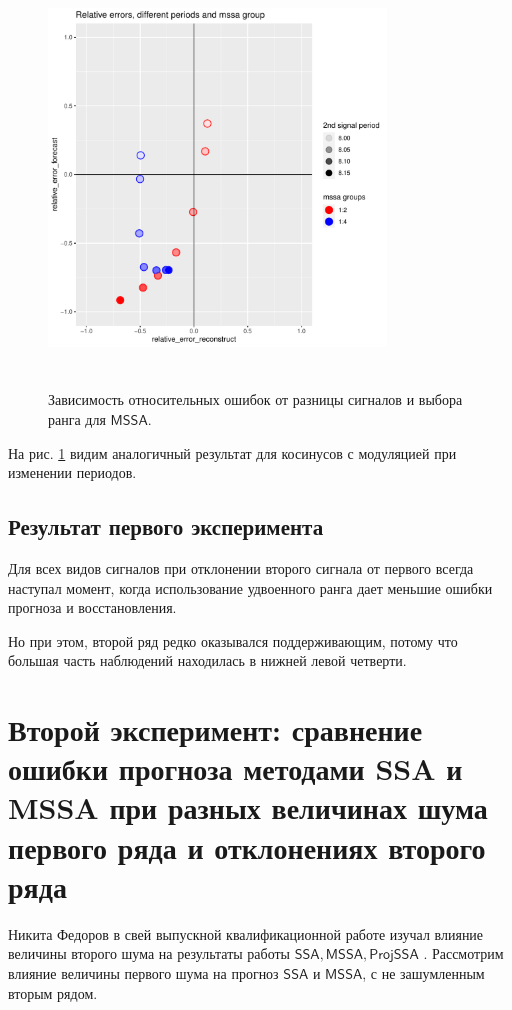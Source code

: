 \documentclass[specialist, substylefile = spbureport.rtx,
    subf,href,colorlinks=true, 12pt]{disser}
\newcommand{\SSA}{\mathsf{SSA}}
\newcommand{\MSSA}{\mathsf{MSSA}}
\newcommand{\ProjSSA}{\mathsf{ProjSSA}}
\begin{document}
        \begin{figure}[h]
            \centering
            \includegraphics[height=11cm, width=0.8\textwidth]{experiment_1_expcos2.pdf}
            \caption{Зависимость относительных ошибок от разницы сигналов и выбора ранга для $\MSSA$.}
            \label{fig:exp1_expcos2}
        \end{figure}

        На рис. \ref{fig:exp1_expcos2} видим аналогичный результат для косинусов с модуляцией при изменении периодов.

    \subsection{Результат первого эксперимента}

        Для всех видов сигналов при отклонении второго сигнала от первого всегда наступал момент, когда использование удвоенного ранга дает меньшие ошибки прогноза и восстановления.

        Но при этом, второй ряд редко оказывался поддерживающим, потому что большая часть наблюдений находилась в нижней левой четверти.


    \section{Второй эксперимент: сравнение ошибки прогноза методами SSA и MSSA при разных величинах шума первого ряда и отклонениях второго ряда}
        Никита Федоров в свей выпускной квалификационной работе изучал влияние величины второго шума на результаты работы $\SSA, \MSSA, \ProjSSA$ \cite[глава 3, стр. 17]{supportive_mssa}. Рассмотрим влияние величины первого шума на прогноз $\SSA$ и $\MSSA$, с не зашумленным вторым рядом.
\end{document}
